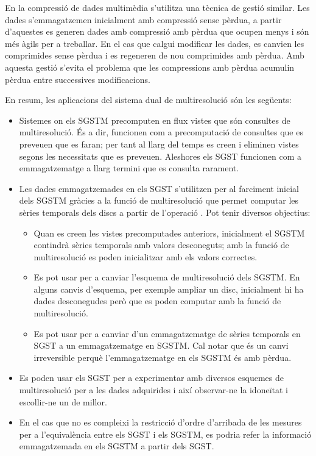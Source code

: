 En la compressió de dades multimèdia s'utilitza una tècnica de gestió
similar.  Les dades s'emmagatzemen inicialment amb compressió sense
pèrdua, a partir d'aquestes es generen dades amb compressió amb pèrdua
que ocupen menys i són més àgils per a treballar. En el cas que calgui
modificar les dades, es canvien les comprimides sense pèrdua i es
regeneren de nou comprimides amb pèrdua. Amb aquesta gestió s'evita el
problema que les compressions amb pèrdua acumulin pèrdua entre
successives modificacions.  



En resum, les aplicacions del sistema dual de multiresolució són les
següents:
\begin{itemize}
\item Sistemes on els \gls{SGSTM} precomputen en flux vistes que són
  consultes de multiresolució. És a dir, funcionen com a precomputació
  de consultes que es preveuen que es faran; per tant al llarg del
  temps es creen i eliminen vistes segons les necessitats que es
  preveuen. Aleshores els \gls{SGST} funcionen com a emmagatzematge a
  llarg termini que es consulta rarament.


\item Les dades emmagatzemades en els \gls{SGST} s'utilitzen per al
  farciment inicial dels \gls{SGSTM} gràcies a la funció de
  multiresolució que permet computar les sèries temporals dels discs a
  partir de l'operació . Pot tenir diversos
  objectius:
  \begin{itemize}
  \item Quan es creen les vistes precomputades anteriors, inicialment
    el \gls{SGSTM} contindrà sèries temporals amb valors desconeguts;
    amb la funció de multiresolució es poden inicialitzar amb els
    valors correctes.

  \item Es pot usar per a canviar l'esquema de multiresolució dels
    \gls{SGSTM}. En alguns canvis d'esquema, per exemple ampliar un
    disc, inicialment hi ha dades desconegudes però que es poden
    computar amb la funció de multiresolució.

  \item Es pot usar per a canviar d'un emmagatzematge de sèries
    temporals en \gls{SGST} a un emmagatzematge en \gls{SGSTM}. Cal
    notar que és un canvi irreversible perquè l'emmagatzematge en els
    \gls{SGSTM} és amb pèrdua.
  \end{itemize}

\item Es poden usar els \gls{SGST} per a experimentar amb diversos
  esquemes de multiresolució per a les dades adquirides i així
  observar-ne la idoneïtat i escollir-ne un de millor.

\item En el cas que no es compleixi la restricció d'ordre d'arribada
  de les mesures per a l'equivalència entre els \gls{SGST} i els
  \gls{SGSTM}, es podria refer la informació emmagatzemada en els
  \gls{SGSTM} a partir dels \gls{SGST}.

\end{itemize}


